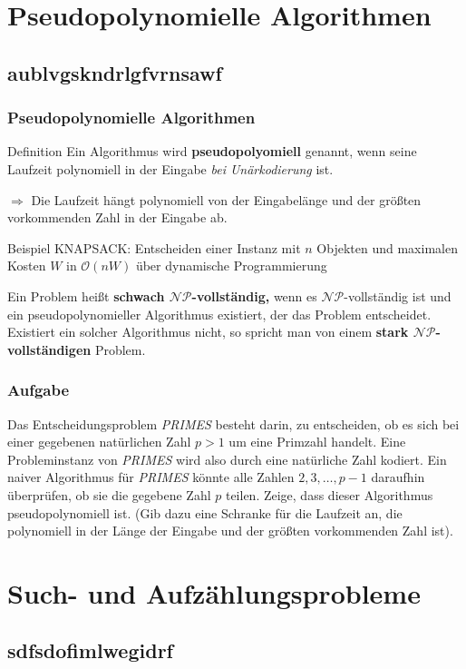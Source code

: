 \section{Pseudopolynomielle Algorithmen}
\subsection{aublvgskndrlgfvrnsawf}
\begin{frame}
\frametitle{Pseudopolynomielle Algorithmen}
\begin{block}{Definition}
Ein Algorithmus wird \textbf{pseudopolyomiell} genannt, wenn seine Laufzeit polynomiell in der Eingabe \textit{bei Unärkodierung} ist.
\end{block}

$\Rightarrow$ Die Laufzeit hängt polynomiell von der Eingabelänge und der größten vorkommenden Zahl in der Eingabe ab. \micropause

Beispiel KNAPSACK: Entscheiden einer Instanz mit $n$ Objekten und maximalen Kosten $W$ in $\mathcal O (nW)$ über dynamische Programmierung \micropause

\pause
Ein Problem heißt \textbf{schwach $\mathcal{NP}$-vollständig,} wenn es $\mathcal{NP}$-vollständig ist und ein pseudopolynomieller Algorithmus existiert, der das Problem entscheidet.\micropause
Existiert ein solcher Algorithmus nicht, so spricht man von einem \textbf{stark $\mathcal{NP}$-vollständigen} Problem.
\end{frame}

\begin{frame}
\frametitle{Aufgabe}
Das Entscheidungsproblem \textit{PRIMES} besteht darin, zu entscheiden, ob es sich bei einer gegebenen natürlichen Zahl $p>1$ um eine Primzahl handelt. 
Eine Probleminstanz von \textit{PRIMES} wird also durch eine natürliche Zahl kodiert.  \micropause
Ein naiver Algorithmus für \textit{PRIMES} könnte alle Zahlen $2,3,\ldots,p-1$ daraufhin überprüfen, ob sie die gegebene Zahl $p$ teilen.  \micropause
Zeige, dass dieser Algorithmus pseudopolynomiell ist. 
(Gib dazu eine Schranke für die Laufzeit an, die polynomiell in der Länge der Eingabe und der größten vorkommenden Zahl ist).
\end{frame}

\section{Such- und Aufzählungsprobleme}
\subsection{sdfsdofimlwegidrf}
